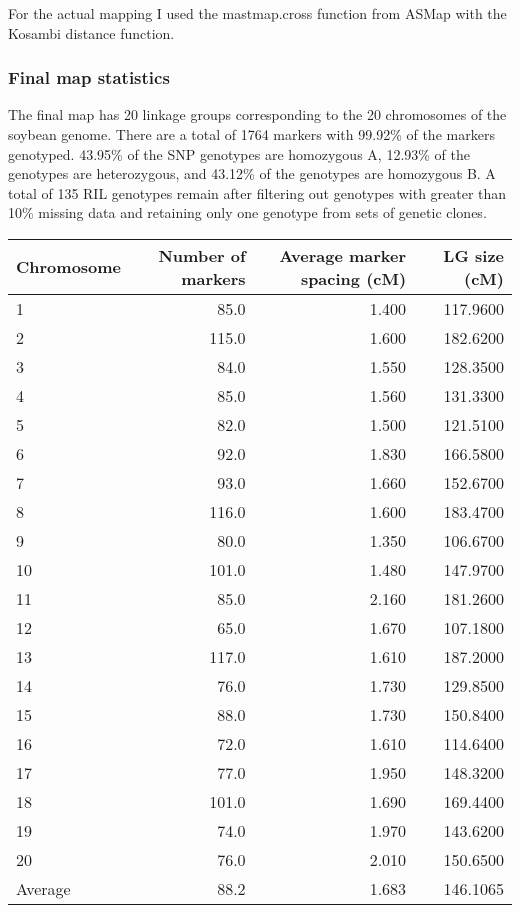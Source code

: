 \documentclass[
]{article}
\begin{document}
For the actual mapping I used the mastmap.cross function from ASMap with
the Kosambi distance function.

\hypertarget{final-map-statistics}{%
\subsubsection{Final map statistics}\label{final-map-statistics}}

The final map has 20 linkage groups corresponding to the 20 chromosomes
of the soybean genome. There are a total of 1764 markers with 99.92\% of
the markers genotyped. 43.95\% of the SNP genotypes are homozygous A,
12.93\% of the genotypes are heterozygous, and 43.12\% of the genotypes
are homozygous B. A total of 135 RIL genotypes remain after filtering
out genotypes with greater than 10\% missing data and retaining only one
genotype from sets of genetic clones.

\begin{table}
\centering
\begin{tabular}[t]{l|r|r|r}
\hline
Chromosome & Number of markers & Average marker spacing (cM) & LG size (cM)\\
\hline
1 & 85.0 & 1.400 & 117.9600\\
\hline
2 & 115.0 & 1.600 & 182.6200\\
\hline
3 & 84.0 & 1.550 & 128.3500\\
\hline
4 & 85.0 & 1.560 & 131.3300\\
\hline
5 & 82.0 & 1.500 & 121.5100\\
\hline
6 & 92.0 & 1.830 & 166.5800\\
\hline
7 & 93.0 & 1.660 & 152.6700\\
\hline
8 & 116.0 & 1.600 & 183.4700\\
\hline
9 & 80.0 & 1.350 & 106.6700\\
\hline
10 & 101.0 & 1.480 & 147.9700\\
\hline
11 & 85.0 & 2.160 & 181.2600\\
\hline
12 & 65.0 & 1.670 & 107.1800\\
\hline
13 & 117.0 & 1.610 & 187.2000\\
\hline
14 & 76.0 & 1.730 & 129.8500\\
\hline
15 & 88.0 & 1.730 & 150.8400\\
\hline
16 & 72.0 & 1.610 & 114.6400\\
\hline
17 & 77.0 & 1.950 & 148.3200\\
\hline
18 & 101.0 & 1.690 & 169.4400\\
\hline
19 & 74.0 & 1.970 & 143.6200\\
\hline
20 & 76.0 & 2.010 & 150.6500\\
\hline
Average & 88.2 & 1.683 & 146.1065\\
\hline
\end{tabular}
\end{table}
\end{document}
